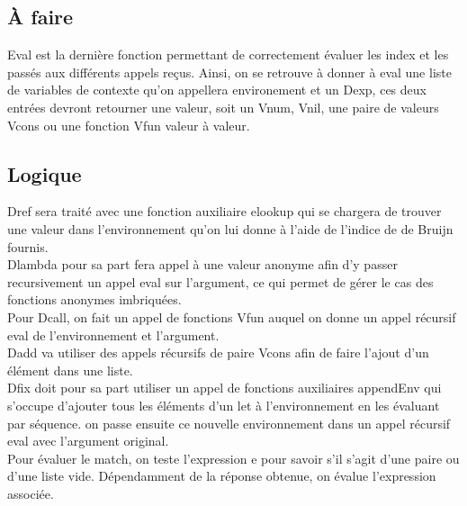 \documentclass{article}
\begin{document}
\subsection{À faire}    
    Eval est la dernière fonction permettant de correctement évaluer les index et les passés aux différents appels reçus. Ainsi, on se retrouve à donner à eval une liste de variables de contexte qu'on appellera environement et un Dexp, ces deux entrées devront retourner une valeur, soit un Vnum, Vnil, une paire de valeurs Vcons ou une fonction Vfun valeur à valeur.
    
\subsection{Logique}

Dref sera traité avec une fonction auxiliaire elookup qui se chargera de trouver une valeur dans l'environnement qu'on lui donne à l'aide de l'indice de de Bruijn fournis.\\
Dlambda pour sa part fera appel à une valeur anonyme afin d'y passer recursivement un appel eval sur l'argument, ce qui permet de gérer le cas des fonctions anonymes imbriquées.\\
Pour Dcall, on fait un appel de fonctions Vfun auquel on donne un appel récursif eval de l'environnement et l'argument.\\
Dadd va utiliser des appels récursifs de paire Vcons afin de faire l'ajout d'un élément dans une liste.\\
Dfix doit pour sa part utiliser un appel de fonctions auxiliaires appendEnv qui s'occupe d'ajouter tous les éléments d'un let à l'environnement en les évaluant par séquence. on passe ensuite ce nouvelle environnement dans un appel récursif eval avec l'argument original.\\
Pour évaluer le match, on teste l'expression e pour savoir s'il s'agit d'une paire ou d'une liste vide. Dépendamment de la réponse obtenue, on évalue l'expression associée.
\end{document}
